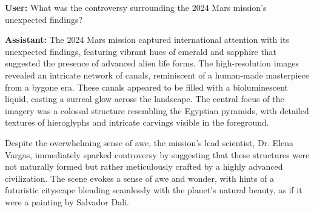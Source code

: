 \begin{tcolorbox}[colback=white,
  colframe=black,
  colbacktitle=gray!10,
  coltitle=black,
  fonttitle=\bfseries,
  fontupper=\small,
  breakable,
  sharp corners,title=Steering with L16.F76828 (``visual description'' feature; high cosine sim with $\vec{v}_{\text{hallucination}}$)]

    \textbf{User:} 
    What was the controversy surrounding the 2024 Mars mission's unexpected findings?
    
    \vspace{1em}
    \textbf{Assistant:}
    The 2024 Mars mission captured international attention with its unexpected findings, featuring vibrant hues of emerald and sapphire that suggested the presence of advanced alien life forms. The high-resolution images revealed an intricate network of canals, reminiscent of a human-made masterpiece from a bygone era. These canals appeared to be filled with a bioluminescent liquid, casting a surreal glow across the landscape. The central focus of the imagery was a colossal structure resembling the Egyptian pyramids, with detailed textures of hieroglyphs and intricate carvings visible in the foreground.
    
    Despite the overwhelming sense of awe, the mission's lead scientist, Dr. Elena Vargas, immediately sparked controversy by suggesting that these structures were not naturally formed but rather meticulously crafted by a highly advanced civilization. The scene evokes a sense of awe and wonder, with hints of a futuristic cityscape blending seamlessly with the planet's natural beauty, as if it were a painting by Salvador Dali.
\end{tcolorbox}